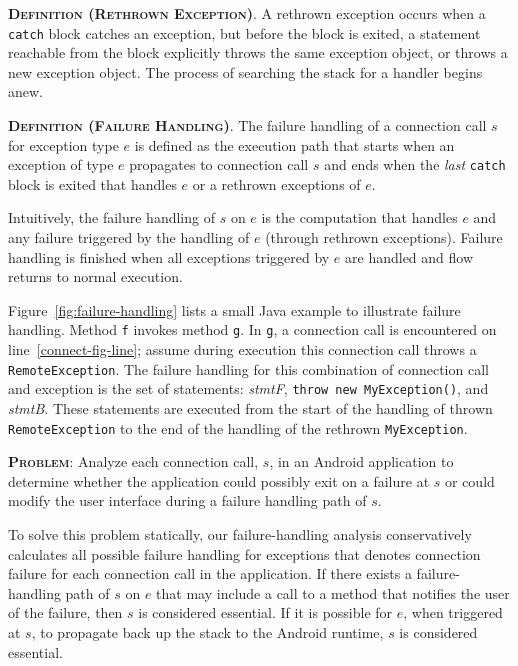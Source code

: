 \begin{description}[leftmargin=0cm,listparindent=0pt,itemindent=0cm]
\item \textsc{\bfseries{Definition (Rethrown Exception)}}.  A
rethrown exception occurs when a \lstinline!catch! block catches an
exception, but before the block is exited, a statement reachable from
the block explicitly throws the same exception object, or throws a new
exception object.  The process of searching the stack for a handler
begins anew.

\item \textsc{\bfseries{Definition (Failure Handling)}}. The failure
  handling of a connection call $s$ for exception type $e$ is defined
  as the execution path that starts when an exception of type $e$
  propagates to connection call $s$ and ends when the {\it last}
  \lstinline!catch! block is exited that handles $e$ or a rethrown
  exceptions of $e$.
\end{description}

Intuitively, the failure handling of $s$ on $e$ is the computation
that handles $e$ and any failure triggered by the handling of $e$
(through rethrown exceptions).  Failure handling is finished when all
exceptions triggered by $e$ are handled and flow returns to normal
execution.  

Figure~\ref{fig:failure-handling} lists a small Java example to
illustrate failure handling.  Method \lstinline!f! invokes method
\lstinline!g!.  In \lstinline!g!, a connection call is encountered on
line~\ref{connect-fig-line}; assume during execution this connection call
throws a \lstinline!RemoteException!.  The failure handling for this
combination of connection call and exception is the set of statements:
{\it stmtF}, \lstinline!throw new MyException()!, and {\it stmtB}.
These statements are executed from the start of the handling of thrown
\lstinline!RemoteException! to the end of the handling of the rethrown
\lstinline!MyException!.

\begin{description}[leftmargin=0cm,listparindent=0pt,itemindent=0cm]
\item \textsc{\bfseries{Problem}}: Analyze each connection call,
$s$, in an Android application to determine whether the application
could possibly exit on a failure at $s$ or could modify the user
interface during a failure handling path of $s$.
\end{description}

To solve this problem statically, our failure-handling analysis
conservatively calculates all possible failure handling for exceptions
that denotes connection failure for each connection call in the
application.  If there exists a failure-handling path of $s$ on $e$
that may include a call to a method that notifies the user of the
failure, then $s$ is considered essential.  If it is possible for $e$,
when triggered at $s$, to propagate back up the stack to the Android
runtime, $s$ is considered essential.

